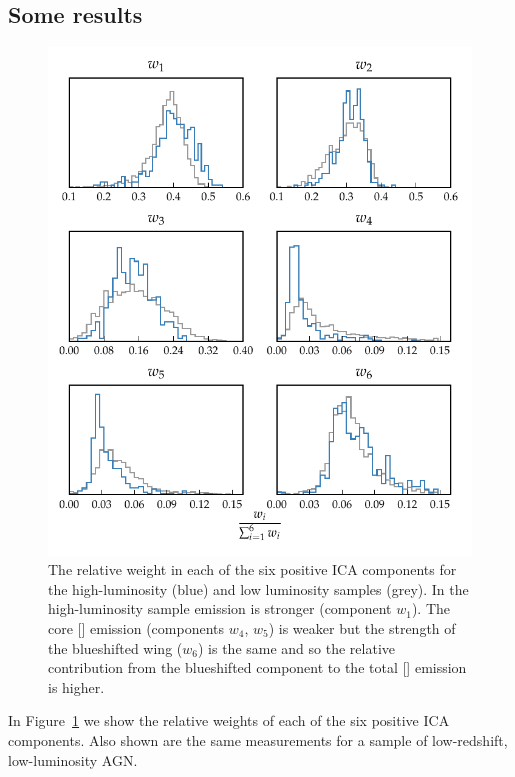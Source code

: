\subsection{Some results}

\begin{figure}
\centering 
    \includegraphics[width=\textwidth]{figures/chapter04/mfica_component_weights.pdf} 
    \caption[{The relative weight in each of the six positive ICA components for the high-luminosity and low luminosity samples.}]{The relative weight in each of the six positive ICA components for the high-luminosity (blue) and low luminosity samples (grey). In the high-luminosity sample  emission is stronger (component $w_1$). The core [] emission (components $w_4$, $w_5$) is weaker but the strength of the blueshifted wing ($w_6$) is the same and so the relative contribution from the blueshifted component to the total [] emission is higher.}     
    \label{fig:mfica_component_weights}
\end{figure}


In Figure~\ref{fig:mfica_component_weights} we show the relative weights of each of the six positive ICA components. 
Also shown are the same measurements for a sample of low-redshift, low-luminosity AGN. 


